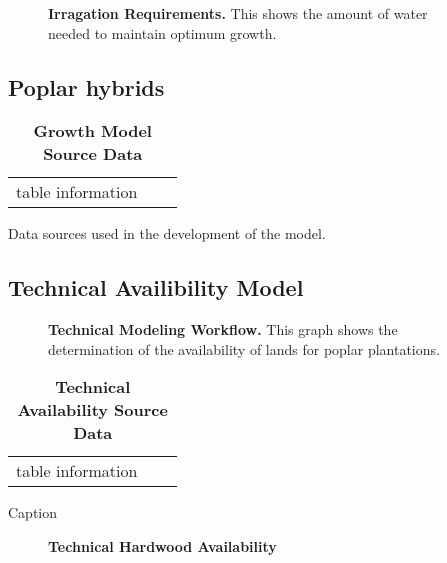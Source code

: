 \documentclass[10pt]{article}
\begin{document}
\begin{figure}[!ht]
\begin{center}
\end{center}
\caption{ {\bf Irragation Requirements.} This shows the amount of
  water needed to maintain optimum growth.} 
\label{fig:growth-map}
\end{figure}

\subsection*{Poplar hybrids}

\begin{table}[!ht]
\caption{
\bf{Growth Model Source Data}}
\begin{tabular}{|c|c|c|}
table information
\end{tabular}
\begin{flushleft}Data sources used in the development of the model.
\end{flushleft}
\label{tab:data}
 \end{table}


\subsection*{Technical Availibility Model}

\begin{figure}[!ht]
\begin{center}
\end{center}
\caption{ {\bf Technical Modeling Workflow.} This graph shows the determination of the availability of lands for poplar plantations.  }
\label{fig:tech-model}
\end{figure}


\begin{table}[!ht]
\caption{
\bf{Technical Availability Source Data}}
\begin{tabular}{|c|c|c|}
table information
\end{tabular}
\begin{flushleft}Caption
\end{flushleft}
\label{tab:}
 \end{table}

\begin{figure}[!ht]
\begin{center}
\end{center}
\caption{ {\bf Technical Hardwood Availability}  }
\label{fig:tech-map}
\end{figure}
\end{document}
